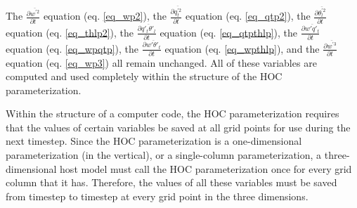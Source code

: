 \documentclass[11pt,fleqn]{article}
\newcommand{\ptlder}[2]{\frac{\partial #1}{\partial #2}}
\begin{document}
The $\ptlder{\overline{w^{'2}}}{t}$ equation (eq. \ref{eq_wp2}),
the $\ptlder{\overline{q_t^{'2}}}{t}$ equation (eq. \ref{eq_qtp2}),
the $\ptlder{\overline{\theta_l^{'2}}}{t}$ equation (eq. \ref{eq_thlp2}),
the $\ptlder{\overline{q'_t\theta'_l}}{t}$ equation (eq. \ref{eq_qtpthlp}),
the $\ptlder{\overline{w'q'_t}}{t}$ equation (eq. \ref{eq_wpqtp}),
the $\ptlder{\overline{w'\theta'_t}}{t}$ equation (eq. \ref{eq_wpthlp}),
and the $\ptlder{\overline{w^{'3}}}{t}$ equation (eq. \ref{eq_wp3})
all remain unchanged.  All of these variables are computed and used completely
within the structure of the HOC parameterization.

Within the structure of a computer code, the HOC parameterization requires that
the values of certain variables be saved at all grid points for use during the
next timestep.  Since the HOC parameterization is a one-dimensional 
parameterization (in the vertical), or a single-column parameterization, a
three-dimensional host model must call the HOC parameterization once for every
grid column that it has.  Therefore, the values of all these variables must be
saved from timestep to timestep at every grid point in the three dimensions.
\end{document}
